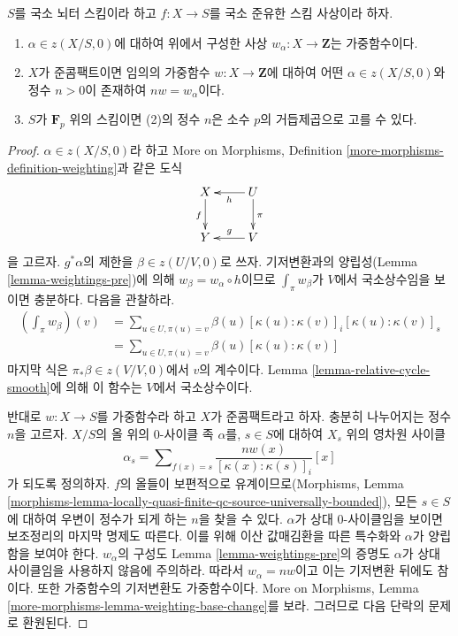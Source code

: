 \begin{lemma}
\label{lemma-weightings}
$S$를 국소 뇌터 스킴이라 하고 $f : X \to S$를 국소 준유한 스킴
사상이라 하자.
\begin{enumerate}
\item $\alpha \in z(X/S, 0)$에 대하여 위에서 구성한 사상
$w_\alpha : X \to \mathbf{Z}$는 가중함수이다.
\item $X$가 준콤팩트이면 임의의 가중함수 $w : X \to \mathbf{Z}$에
대하여 어떤 $\alpha \in z(X/S, 0)$와 정수 $n > 0$이 존재하여
$nw = w_\alpha$이다.
\item $S$가 $\mathbf{F}_p$ 위의 스킴이면 (2)의 정수 $n$은 소수
$p$의 거듭제곱으로 고를 수 있다.
\end{enumerate}
\end{lemma}

\begin{proof}
$\alpha \in z(X/S, 0)$라 하고 More on Morphisms, Definition
\ref{more-morphisms-definition-weighting}과 같은 도식
$$
\xymatrix{
X \ar[d]_f & U \ar[l]^h \ar[d]^\pi \\
Y & V \ar[l]_g
}
$$
을 고르자. $g^*\alpha$의 제한을 $\beta \in z(U/V, 0)$로 쓰자.
기저변환과의 양립성(Lemma \ref{lemma-weightings-pre})에 의해
$w_\beta = w_\alpha \circ h$이므로
$\int_\pi w_\beta$가 $V$에서 국소상수임을 보이면 충분하다.
다음을 관찰하라.
\begin{align*}
\left( \int_\pi w_\beta \right)(v)
& =
\sum\nolimits_{u \in U, \pi(u) = v} 
\beta(u) [\kappa(u) : \kappa(v)]_i [\kappa(u) : \kappa(v)]_s \\
& =
\sum\nolimits_{u \in U, \pi(u) = v} \beta(u)[\kappa(u) : \kappa(v)]
\end{align*}
마지막 식은 $\pi_*\beta \in z(V/V, 0)$에서 $v$의 계수이다.
Lemma \ref{lemma-relative-cycle-smooth}에 의해 이 함수는 $V$에서
국소상수이다.

\medskip\noindent
반대로 $w : X \to S$를 가중함수라 하고 $X$가 준콤팩트라고 하자.
충분히 나누어지는 정수 $n$을 고르자. $X/S$의 올 위의 $0$-사이클
족 $\alpha$를, $s \in S$에 대하여 $X_s$ 위의 영차원 사이클
$$
\alpha_s =
\sum\nolimits_{f(x) = s} \frac{n w(x)}{[\kappa(x) : \kappa(s)]_i} [x]
$$
가 되도록 정의하자. $f$의 올들이 보편적으로 유계이므로(Morphisms,
Lemma \ref{morphisms-lemma-locally-quasi-finite-qc-source-universally-bounded}),
모든 $s \in S$에 대하여 우변이 정수가 되게 하는 $n$을 찾을 수 있다.
$\alpha$가 상대 $0$-사이클임을 보이면 보조정리의 마지막 명제도
따른다. 이를 위해 이산 값매김환을 따른 특수화와 $\alpha$가
양립함을 보여야 한다. $w_\alpha$의 구성도 Lemma
\ref{lemma-weightings-pre}의 증명도 $\alpha$가 상대 사이클임을 사용하지
않음에 주의하라. 따라서 $w_\alpha = nw$이고 이는 기저변환 뒤에도
참이다. 또한 가중함수의 기저변환도 가중함수이다. More on Morphisms,
Lemma \ref{more-morphisms-lemma-weighting-base-change}를 보라. 그러므로
다음 단락의 문제로 환원된다.


\end{proof}
